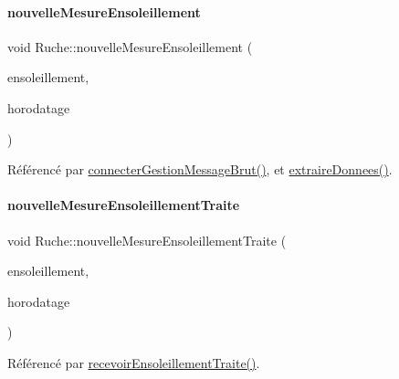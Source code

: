 \mbox{\label{class_ruche_aa9eaf4dd1b60e525c7d1bb5319130ce1}} 
\paragraph{\texorpdfstring{nouvelle\+Mesure\+Ensoleillement}{nouvelleMesureEnsoleillement}}
{\footnotesize\ttfamily void Ruche\+::nouvelle\+Mesure\+Ensoleillement (\begin{DoxyParamCaption}\item[{Q\+String}]{ensoleillement,  }\item[{Q\+String}]{horodatage }\end{DoxyParamCaption})\hspace{0.3cm}{\ttfamily [signal]}}



Référencé par \hyperlink{class_ruche_a9c8e7e3b529676c6dda3d936370af00f}{connecter\+Gestion\+Message\+Brut()}, et \hyperlink{class_ruche_a21c0dafeaec03d451590037343e6a3ca}{extraire\+Donnees()}.

\mbox{\label{class_ruche_ac0cf9ceae0a82739dbb4c2d33c4a2494}} 
\paragraph{\texorpdfstring{nouvelle\+Mesure\+Ensoleillement\+Traite}{nouvelleMesureEnsoleillementTraite}}
{\footnotesize\ttfamily void Ruche\+::nouvelle\+Mesure\+Ensoleillement\+Traite (\begin{DoxyParamCaption}\item[{double}]{ensoleillement,  }\item[{Q\+String}]{horodatage }\end{DoxyParamCaption})\hspace{0.3cm}{\ttfamily [signal]}}



Référencé par \hyperlink{class_ruche_a581320fbd44c1752d10aa0e6e533863c}{recevoir\+Ensoleillement\+Traite()}.

\mbox{\label{class_ruche_adab3ce6ee33b3e6306aa7dc4f2ca1f20}} 
